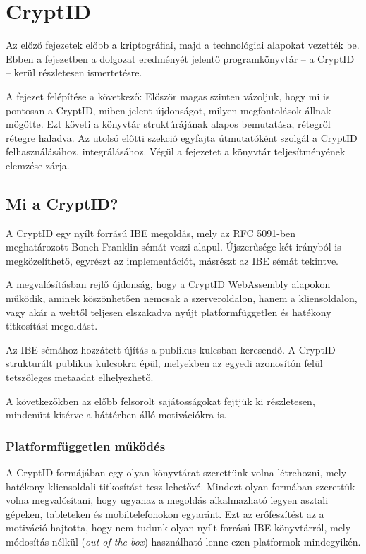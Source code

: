 \chapter{CryptID}

Az előző fejezetek előbb a kriptográfiai, majd a technológiai alapokat vezették be. Ebben a fejezetben a dolgozat eredményét jelentő programkönyvtár – a CryptID – kerül részletesen ismertetésre.

A fejezet felépítése a következő: Először magas szinten vázoljuk, hogy mi is pontosan a CryptID, miben jelent újdonságot, milyen megfontolások állnak mögötte. Ezt követi a könyvtár struktúrájának alapos bemutatása, rétegről rétegre haladva. Az utolsó előtti szekció egyfajta útmutatóként szolgál a CryptID felhasználásához, integrálásához. Végül a fejezetet a könyvtár teljesítményének elemzése zárja.


\section{Mi a CryptID?}

A CryptID egy nyílt forrású IBE megoldás, mely az RFC 5091-ben meghatározott Boneh-Franklin sémát veszi alapul. Újszerűsége két irányból is megközelíthető, egyrészt az implementációt, másrészt az IBE sémát tekintve. 

A megvalósításban rejlő újdonság, hogy a CryptID WebAssembly alapokon működik, aminek köszönhetően nemcsak a szerveroldalon, hanem a kliensoldalon, vagy akár a webtől teljesen elszakadva nyújt platformfüggetlen és hatékony titkosítási megoldást.

Az IBE sémához hozzátett újítás a publikus kulcsban keresendő. A CryptID strukturált publikus kulcsokra épül, melyekben az egyedi azonosítón felül tetszőleges metaadat elhelyezhető.

A következőkben az előbb felsorolt sajátosságokat fejtjük ki részletesen, mindenütt kitérve a háttérben álló motivációkra is.

\subsection{Platformfüggetlen működés}

A CryptID formájában egy olyan könyvtárat szerettünk volna létrehozni, mely hatékony kliensoldali titkosítást tesz lehetővé. Mindezt olyan formában szerettük volna megvalósítani, hogy ugyanaz a megoldás alkalmazható legyen asztali gépeken, tableteken és mobiltelefonokon egyaránt. Ezt az erőfeszítést az a motiváció hajtotta, hogy nem tudunk olyan nyílt forrású IBE könyvtárról, mely módosítás nélkül (\textit{out-of-the-box}) használható lenne ezen platformok mindegyikén.


